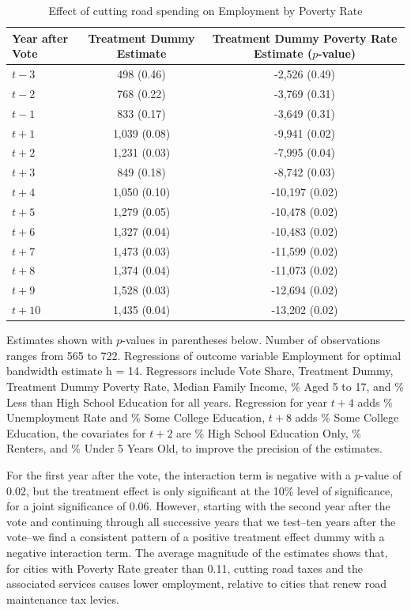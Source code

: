 \begin{table}[ht]
    \centering
    \caption{Effect of cutting road spending on Employment by Poverty Rate}
    \label{tab:treatment_dummy_poverty}
    \begin{tabular}{p{2cm}cc}
        \hline
        Year after Vote & Treatment Dummy Estimate & Treatment Dummy  Poverty Rate Estimate ($p$-value) \\
        \hline
        $t - 3$ & 498 (0.46) & -2,526 (0.49) \\
        $t - 2$ & 768 (0.22) & -3,769 (0.31) \\
        $t - 1$ & 833 (0.17) & -3,649 (0.31) \\
        $t + 1$ & 1,039 (0.08) & -9,941 (0.02) \\
        $t + 2$ & 1,231 (0.03) & -7,995 (0.04) \\
        $t + 3$ & 849 (0.18) & -8,742 (0.03) \\
        $t + 4$ & 1,050 (0.10) & -10,197 (0.02) \\
        $t + 5$ & 1,279 (0.05) & -10,478 (0.02) \\
        $t + 6$ & 1,327 (0.04) & -10,483 (0.02) \\
        $t + 7$ & 1,473 (0.03) & -11,599 (0.02) \\
        $t + 8$ & 1,374 (0.04) & -11,073 (0.02) \\
        $t + 9$ & 1,528 (0.03) & -12,694 (0.02) \\
        $t + 10$ & 1,435 (0.04) & -13,202 (0.02) \\
        \hline
    \end{tabular}
    \begin{tablenotes}
        \small
        \item Estimates shown with $p$-values in parentheses below. Number of observations ranges from 565 to 722. Regressions of outcome variable Employment for optimal bandwidth estimate h = 14. Regressors include Vote Share, Treatment Dummy, Treatment Dummy  Poverty Rate, Median Family Income, \% Aged 5 to 17, and \% Less than High School Education for all years. Regression for year $t + 4$ adds \% Unemployment Rate and \% Some College Education, $t + 8$ adds \% Some College Education, the covariates for $t + 2$ are \% High School Education Only, \% Renters, and \% Under 5 Years Old, to improve the precision of the estimates.
    \end{tablenotes}
\end{table}

For the first year after the vote, the interaction term is negative with a $p$-value of 0.02, but the treatment effect is only significant at the 10\% level of significance, for a joint significance of 0.06.  However, starting with the second year after the vote and continuing through all successive years that we test--ten years after the vote--we find a consistent pattern of a positive treatment effect dummy with a negative interaction term.  The average magnitude of the estimates shows that, for cities with Poverty Rate greater than 0.11, cutting road taxes and the associated services causes lower employment, relative to cities that renew road maintenance tax levies. 

